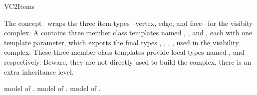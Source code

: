 
\ccRefPageBegin

\begin{ccRefConcept}{VC2Items}

\ccDefinition
  
The concept \ccRefName\ wraps the three item types --vertex, edge, and
face-- for the visibity complex.  A \ccRefName{} contains three member
class templates named , , and
, each with one template parameter, which exports the
final types , , , ,
 used in the visibility complex.  These three member class
templates provide local types named ,  and 
respectively. Beware, they are not directly used to build the complex,
there is an extra inheritance level.

\ccTypes
{}
    {model of .}
\ccGlue
{}
    {model of .}
\ccGlue
{}
    {model of .}

\ccHasModels
{}\\

\ccSeeAlso

\\
\\
\end{ccRefConcept}
\ccRefPageEnd
